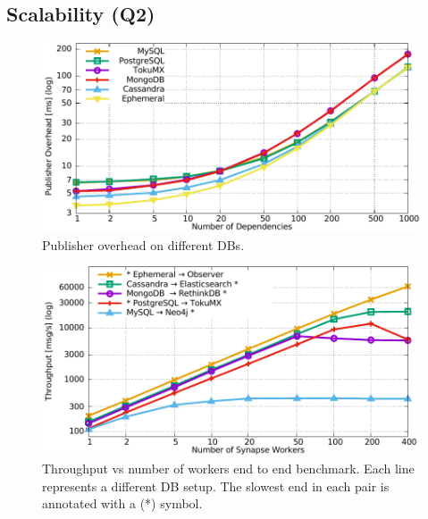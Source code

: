 \subsection{Scalability (Q2)}
\label{sec:evaluation:scalability}

\begin{figure}[]
  \centering
  \includegraphics[width=\linewidth]{figures/synapse/overheadvsdeps.pdf}
  \caption{Publisher overhead on different DBs.}
  \label{fig:overhead}
\end{figure}


\begin{figure}[]
  \centering
  \includegraphics[width=\linewidth]{figures/synapse/db-throughput-vs-workers.pdf}
  \caption{Throughput vs number of workers end to end benchmark.
      Each line represents a different DB setup.
    The slowest end in each pair is annotated with a (*) symbol.}
    \label{fig:dbs-throughput}
\end{figure}


